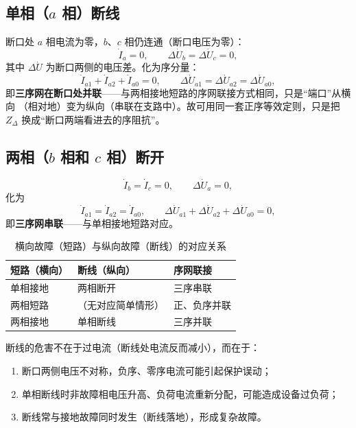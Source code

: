 \subsection{单相（$a$ 相）断线}

断口处 $a$ 相电流为零，$b$、$c$ 相仍连通（断口电压为零）：
\begin{equation}
  \dot I_a=0,\qquad \Delta\dot U_b=\Delta\dot U_c=0,
\end{equation}
其中 $\Delta\dot U$ 为断口两侧的电压差。化为序分量：
\begin{equation}
  \dot I_{a1}+\dot I_{a2}+\dot I_{a0}=0,\qquad
  \Delta\dot U_{a1}=\Delta\dot U_{a2}=\Delta\dot U_{a0},
\end{equation}
即\textbf{三序网在断口处并联}——与两相接地短路的序网联接方式相同，只是“端口”从横向
（相对地）变为纵向（串联在支路中）。故可用同一套正序等效定则，只是把
$Z_\Delta$ 换成“断口两端看进去的序阻抗”。

\subsection{两相（$b$ 相和 $c$ 相）断开}

\begin{equation}
  \dot I_b=\dot I_c=0,\qquad \Delta\dot U_a=0,
\end{equation}
化为
\begin{equation}
  \dot I_{a1}=\dot I_{a2}=\dot I_{a0},\qquad
  \Delta\dot U_{a1}+\Delta\dot U_{a2}+\Delta\dot U_{a0}=0,
\end{equation}
即\textbf{三序网串联}——与单相接地短路对应。

\begin{table}[htbp]
  \centering
  \caption{横向故障（短路）与纵向故障（断线）的对应关系}
  \small
  \begin{tabular}{@{}lll@{}}
    \toprule
    短路（横向） & 断线（纵向） & 序网联接 \\
    \midrule
    单相接地 & 两相断开 & 三序串联 \\
    两相短路 & （无对应简单情形） & 正、负序并联 \\
    两相接地 & 单相断线 & 三序并联 \\
    \bottomrule
  \end{tabular}
\end{table}

断线的危害不在于过电流（断线处电流反而减小），而在于：
\begin{enumerate}
  \item 断口两侧电压不对称，负序、零序电流可能引起保护误动；
  \item 单相断线时非故障相电压升高、负荷电流重新分配，可能造成设备过负荷；
  \item 断线常与接地故障同时发生（断线落地），形成复杂故障。
\end{enumerate}

